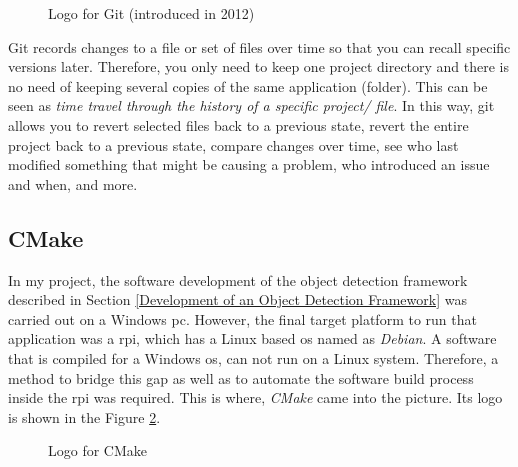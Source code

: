 \documentclass[a4paper,12pt]{report}%
\begin{document}
\begin{figure}[H]
	\centering
	\caption{ Logo for Git (introduced in 2012)\cite{gitlogo}}
	\label{fig:git}
\end{figure}

Git records changes to a file or set of files over time so that you can recall specific versions later. Therefore, you only need to keep one project directory and there is no need of keeping several copies of the same application (folder). This can be seen as \textit{time travel through the history of a specific project/ file}. In this way, git allows you to revert selected files back to a previous state, revert the entire project back to a previous state, compare changes over time, see who last modified something that might be causing a problem, who introduced an issue and when, and more\cite{git}.


\subsection{CMake}

In my project, the software development of the object detection framework described in Section \ref{Development of an Object Detection Framework} was carried out on a Windows \ac{pc}. However, the final target platform to run that application was a \ac{rpi}, which has a Linux based \ac{os} named as \textit{Debian}. A software that is compiled for a  Windows \ac{os}, can not run on a Linux system. Therefore, a method to bridge this gap as well as to automate the software build process inside the \ac{rpi} was required. This is where, \textit{CMake} came into the picture. Its logo is shown in the Figure \ref{fig:cmake}.

\begin{figure}[H]
	\centering
	\caption{ Logo for CMake\cite{cmake}}
	\label{fig:cmake}
\end{figure}
\end{document}
